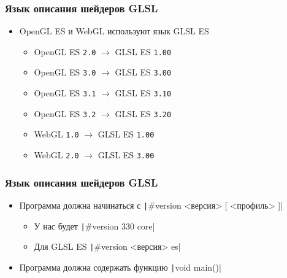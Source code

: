 \documentclass[10pt]{beamer}
\begin{document}
\begin{frame}[fragile]
\frametitle{Язык описания шейдеров GLSL}
\begin{itemize}
\item OpenGL ES и WebGL используют язык GLSL ES
\begin{itemize}
\item OpenGL ES \texttt{2.0} \begin{math}\rightarrow\end{math} GLSL ES \texttt{1.00}
\item OpenGL ES \texttt{3.0} \begin{math}\rightarrow\end{math} GLSL ES \texttt{3.00}
\item OpenGL ES \texttt{3.1} \begin{math}\rightarrow\end{math} GLSL ES \texttt{3.10}
\item OpenGL ES \texttt{3.2} \begin{math}\rightarrow\end{math} GLSL ES \texttt{3.20}
\item WebGL \texttt{1.0} \begin{math}\rightarrow\end{math} GLSL ES \texttt{1.00}
\item WebGL \texttt{2.0} \begin{math}\rightarrow\end{math} GLSL ES \texttt{3.00}
\end{itemize}
\end{itemize}
\end{frame}

\begin{frame}[fragile]
\frametitle{Язык описания шейдеров GLSL}
\begin{itemize}
\item Программа должна начинаться с \texttt|#version <версия> [ <профиль> ]|
\begin{itemize}
\item У нас будет \texttt|#version 330 core|
\pause
\item Для GLSL ES \texttt|#version <версия> es|
\end{itemize}
\pause
\item Программа должна содержать функцию \texttt|void main()|
\end{itemize}
\end{frame}
\end{document}
